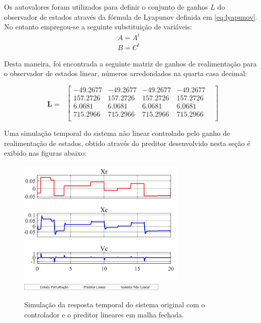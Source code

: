 \documentclass[a4paper]{ifacconf}
\begin{document}
Os autovalores foram utilizados para definir o conjunto de ganhos $L$ do observador de estados através da fórmula de Lyapunov definida em \ref{eq:lyapunov}. No entanto empregou-se a seguinte substituição de variáveis:
 \begin{equation} \label{eq:var_pred}
        \begin{split}
        A = A^{t}&\\
        B = C^{t}&
        \end{split}
 \end{equation}

Desta maneira, foi encontrada a seguinte matriz de ganhos de realimentação para o observador de estados linear, números arredondados na quarta casa decimal:

 \begin{equation} \label{eq:ganhos_pred}
        \begin{split}
            \mathbf{L}=\
        \end{split}
        \begin{bmatrix}
          -49.2677& -49.2677& -49.2677& -49.2677&\\
          157.2726& 157.2726& 157.2726& 157.2726&\\
            6.0681&   6.0681&   6.0681&   6.0681&\\
          715.2966& 715.2966& 715.2966& 715.2966&\\
        \end{bmatrix}
    \end{equation}

    Uma simulação temporal do sistema não linear controlado pelo ganho de realimentação de estados, obtido através do preditor desenvolvido nesta seção é exibido nas figuras abaixo:

    \FloatBarrier
    \begin{figure}[htbp]
        \begin{centering}
            \includegraphics[width=8cm]{img/simulaca_temporal_preditor_linear.png}
            \includegraphics[width=7cm]{img/simulaca_temporal_preditor_linear_erro_leg.png}
            \caption{Simulação da resposta temporal do sistema original com o controlador e o preditor lineares em malha fechada.}
            \label{fig:simulaca_temporal_linear_perturbacao}
        \end{centering}
    \end{figure}
    \FloatBarrier
\end{document}
